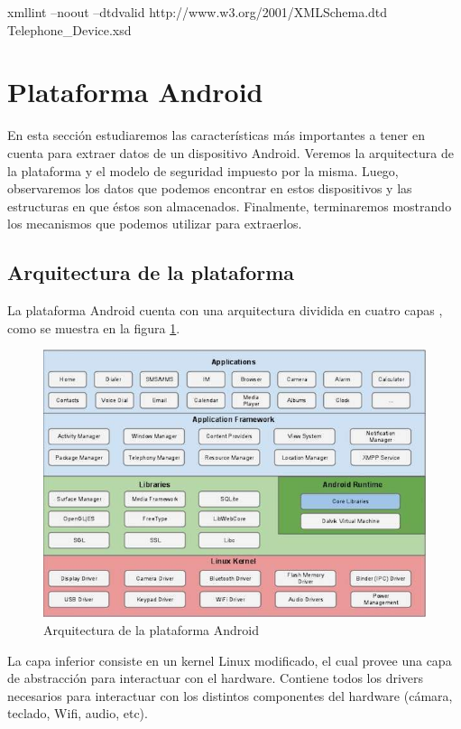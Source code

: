 \begin{bash}
xmllint --noout --dtdvalid http://www.w3.org/2001/XMLSchema.dtd Telephone_Device.xsd
\end{bash}

\section{Plataforma Android}
En esta sección estudiaremos las características más importantes a tener en cuenta para extraer datos de un dispositivo Android. Veremos la arquitectura de la plataforma y el modelo de seguridad impuesto por la misma. Luego, observaremos los datos que podemos encontrar en estos dispositivos y las estructuras en que éstos son almacenados. Finalmente, terminaremos mostrando los mecanismos que podemos utilizar para extraerlos.

\subsection{Arquitectura de la plataforma}
La plataforma Android cuenta con una arquitectura dividida en cuatro capas \cite{androidArch}, como se muestra en la figura \ref{arquitecturaDeAndroid}.

\begin{figure}[t]
    \begin{center}
        \includegraphics[scale=0.6]{figures/android_architecture}
        \caption{Arquitectura de la plataforma Android}
        \label{arquitecturaDeAndroid}
    \end{center}
\end{figure}

La capa inferior consiste en un kernel Linux modificado, el cual provee una capa de abstracción para interactuar con el hardware. Contiene todos los drivers necesarios para interactuar con los distintos componentes del hardware (cámara, teclado, Wifi, audio, etc).


